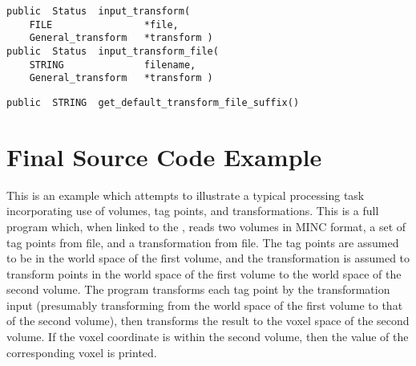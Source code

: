 {\bf\begin{verbatim}
public  Status  input_transform(
    FILE                *file,
    General_transform   *transform )
public  Status  input_transform_file(
    STRING              filename,
    General_transform   *transform )
\end{verbatim}}


{\bf\begin{verbatim}
public  STRING  get_default_transform_file_suffix()
\end{verbatim}}


\chapter{Final Source Code Example}

This is an example which attempts to illustrate a typical processing
task incorporating use of volumes, tag points, and transformations.
This is a full program which, when linked to the \vol,
reads two volumes in MINC format, a set of tag points from file, and a
transformation from file.  The tag points are assumed to be in the
world space of the first volume, and the transformation is assumed to
transform points in the world space of the first volume to the world
space of the second volume.  The program transforms each tag point by
the transformation input (presumably transforming from the world space
of the first volume to that of the second volume), then transforms the
result to the voxel space of the second volume.  If the
voxel coordinate is within the second volume, then the value of the
corresponding voxel is printed.

